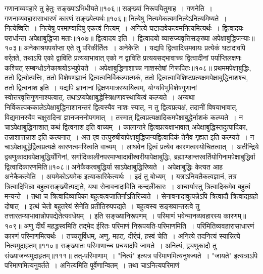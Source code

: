 गणानाव्यवहारे तु हेतुः सङ्ख्याऽभिधीयते॥१०६॥
सङ्ख्यां निरूपयितुमाह~। गणनेति~। गणनाव्यवहारासाधारणं कारणं सङ्ख्येत्यर्थः॥१०६॥
नित्येषु नित्यमेकत्वमनित्येऽनित्यमिष्यते~।
नित्येष्विति~। नित्येषु-परमाण्वादिषु एकत्वं नित्यम्~। अनित्ये-घटादावेकत्वमनित्यमित्यर्थः~।
द्वित्वादयः परार्धान्ता अपेक्षाबुद्धिजा मताः॥१०७॥
द्वित्वादय इति~। द्वित्वादयो व्यासज्यवृत्तिसङ्ख्या अपेक्षाबुद्धिजन्याः॥१०३॥
अनेकाश्रयपर्याप्ता एते तु परिकीर्तितः~।
अनेकेति~। यद्यपि द्वित्वादिसमवायः प्रत्येकं घटादावपि वर्र्तते, तथाऽपि एको द्वाविति प्रत्ययाभावात् एको न द्वाविति प्रत्ययसद्भावाच्च द्वित्वादीनां पर्याप्तिलक्षणः
कश्चित् सम्बन्धोऽनेकाश्रयोऽभ्युपेयते~।
अपेक्षाबुद्धिनाशाच्च नाशस्तेषां निरूपितः॥१०८॥
प्रथममपेक्षाबुद्धिः, ततो द्वित्वोत्पत्तिः, ततो विशेषणज्ञानं द्वित्वत्वनिर्विकल्पात्मकं, ततो द्वित्वत्वाविशिष्टप्रत्यक्षमपेक्षाबुद्धिनाशश्च, ततो द्वित्वनाश इति~।
यद्यपि ज्ञानानां द्विक्षणमात्रस्थायित्वम्, योग्यविभुविशेषगुणानां स्वोत्तरवृत्तिगुणनाश्यत्वात्, तथाऽप्यपेक्षाबुद्धेस्त्रिक्षणावस्थायित्वं कल्प्यते~। अन्यथा
निर्विकल्पककालेऽपेक्षाबुद्धिनाशानन्तरं द्वित्वस्यैव नाशः स्यात्, न तु द्वित्वप्रत्यक्षं, तदानीं विषयाभावात्, विद्यमानस्यैव चक्षुरादिना ज्ञानजननोपगमात्~। तस्मात्
द्वित्वप्रत्यक्षादिकमपेक्षाबुद्धेर्नाशकं कल्प्यते~।
न चाऽपेक्षाबुद्धिनाशात् कथं द्वित्वनाश इति वाच्यम्~। कालान्तरे द्वित्वप्रत्यक्षाभावात् अपेक्षाबुद्धिस्तदुत्पादिका, तन्नाशात्तन्नाश इति कल्पनात्~। अत एव
तत्पुरुषीयापेक्षाबुद्धिजन्यद्वित्वादिकं तेनैव गृह्यत इति कल्प्यते~। न चाऽपेक्षाबुद्धेर्द्वित्वप्रत्यक्षे कारणत्वमस्त्विति वाच्यम्~। लाघवेन द्वित्वं प्रत्येव कारणत्वस्योचितत्वात्~।
अतीन्द्रिये द्व्यणुकादावपेक्षाबुद्धिर्योगिनां, सर्गादिकालीनपरमाण्वादावीश्वरीयापेक्षाबुद्धिः, ब्रह्माण्डान्तरवर्तियोगिनामपेक्षाबुद्धिर्वा द्वित्वादिकारणमिति॥१०८॥
अनेकैकत्वबुद्धिर्या साऽपेक्षाबुद्धिरिष्यते~।
अपेक्षाबुद्धिः केत्यत आह अनेकैकत्वेति~। अयमेकोऽयमेक इत्याकारिकेत्यर्थः~। इदं तु बोध्यम्~। यत्राऽनियतैकत्वज्ञानं, तत्र त्रित्वादिभिन्ना बहुत्वसङ्ख्योेत्पद्यते, यथा
सेनावनादाविति कन्दलीेकारः~।
आचार्यास्तु त्रित्वादिकमेव बहुत्वं मन्यन्ते~। तथा च त्रित्वादिव्यापिका बहुत्वत्वजातिर्नाऽतिरिच्यते~। सेनावनादावुत्पन्नेऽपि त्रित्वादौ त्रित्वाद्यग्रहो दोषात्~। इत्थं चेतो
बहुतरेयं सेनेति प्रतीतिरुपपद्यते~। बहुत्वस्य सङ्ख्यान्तरत्वे तु तत्तारतम्याभावान्नोपपद्येतेत्यवधेयम्~। इति सङ्ख्यानिरूपणम्~।
परिमाणं भवेन्मानव्यवहारस्य कारणम्॥१०९॥
अणु दीर्घं महद्ध्रस्वमिति तद्भेद ईरितः
परिमाणं निरूपयति-परिमाणमिति~। परिमितिव्यवहारासाधारणं कारणं परिमाणमित्यर्थः~। तच्चतुर्विधम्, अणु, महत्, दीर्र्घं, हस्वं चेति~।
अनित्ये तदनित्यं स्यान्नित्ये नित्यमुदाहृतम्॥११०॥
सङ्ख्यातः परिमाणाच्च प्रचयादपि जायते~।
अनित्यं, द्व्यणुकादौ तु संख्याजन्यमुदाहृतम्॥१११॥
तत्-परिमाणाम्~। "नित्यं" इत्यत्र परिमाणमित्यनुषज्यते~। "जायते" इत्यत्राऽपि परिमाणमित्यनुवर्तते~। अनित्यमिति पूर्वेणान्वितम्~। तथा चाऽनित्यपरिमाणं
